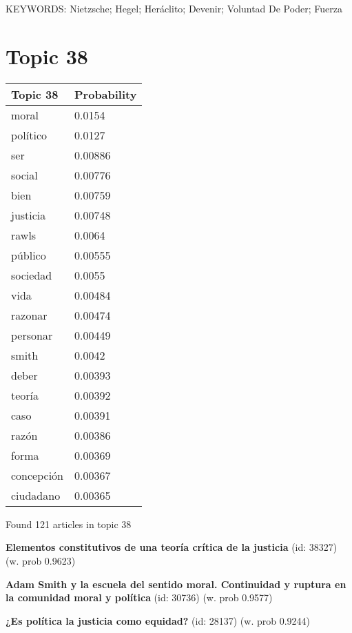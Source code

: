 \documentclass{article}
\begin{document}
KEYWORDS:
Nietzsche; Hegel; Heráclito; Devenir; Voluntad De Poder; Fuerza

\vfill
\newpage


\centering
\thispagestyle{empty}
\section*{Topic 38}\vfill
\begin{tabular}{ll}
\toprule
   Topic 38 & Probability \\
\midrule
      moral &      0.0154 \\
   político &      0.0127 \\
        ser &     0.00886 \\
     social &     0.00776 \\
       bien &     0.00759 \\
   justicia &     0.00748 \\
      rawls &      0.0064 \\
    público &     0.00555 \\
   sociedad &      0.0055 \\
       vida &     0.00484 \\
    razonar &     0.00474 \\
   personar &     0.00449 \\
      smith &      0.0042 \\
      deber &     0.00393 \\
     teoría &     0.00392 \\
       caso &     0.00391 \\
      razón &     0.00386 \\
      forma &     0.00369 \\
 concepción &     0.00367 \\
  ciudadano &     0.00365 \\
\bottomrule
\end{tabular}

\vfill
Found 121 articles in topic 38
\vfill

\textbf{Elementos constitutivos de una teoría crítica de la justicia} (id: 38327)
 (w. prob 0.9623)
\vfill

\textbf{Adam Smith y la escuela del sentido moral. Continuidad y ruptura en la comunidad moral y política} (id: 30736)
 (w. prob 0.9577)
\vfill

\textbf{¿Es política la justicia como equidad?} (id: 28137)
 (w. prob 0.9244)

\vfill
\newpage
\end{document}
